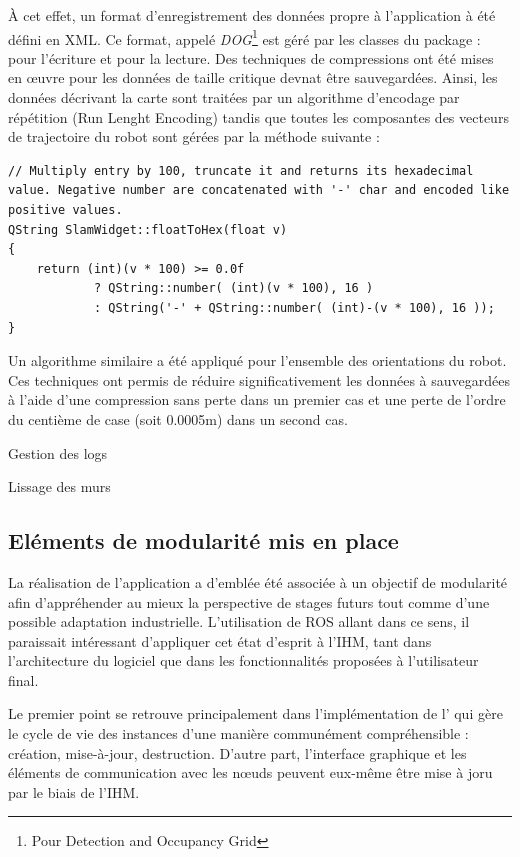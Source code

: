 \`{A} cet effet, un format d'enregistrement des données propre à l'application à été défini en \gls{XML}.
Ce format, appelé \emph{DOG}\footnote{Pour Detection and Occupancy Grid} est géré par les classes du package  :  pour l'écriture et  pour la lecture. 
Des techniques de compressions ont été mises en \oe{}uvre pour les données de taille critique devnat être sauvegardées. 
Ainsi, les données décrivant la carte sont traitées par un algorithme d'encodage par répétition (Run Lenght Encoding) tandis que toutes les composantes des vecteurs de trajectoire du robot sont gérées par la méthode suivante :

\begin{lstlisting}[style=customcpp]
// Multiply entry by 100, truncate it and returns its hexadecimal value. Negative number are concatenated with '-' char and encoded like positive values.
QString SlamWidget::floatToHex(float v)
{
    return (int)(v * 100) >= 0.0f
            ? QString::number( (int)(v * 100), 16 )
            : QString('-' + QString::number( (int)-(v * 100), 16 ));
}
\end{lstlisting}

Un algorithme similaire a été appliqué pour l'ensemble des orientations du robot. 
Ces techniques ont permis de réduire significativement les données à sauvegardées à l'aide d'une compression sans perte dans un  premier cas et une perte de l'ordre du centième de case (soit 0.0005m) dans un second cas.  
  
  Gestion des logs
  
  Lissage des murs
  
  \subsection{Eléments de modularité mis en place}
  
  La réalisation de l'application a d'emblée été associée à un objectif de modularité afin d'appréhender au mieux la perspective de stages futurs tout comme d'une possible adaptation industrielle. 
  L'utilisation de ROS allant dans ce sens, il paraissait intéressant d'appliquer cet état d'esprit à l'\gls{IHM}, tant dans l'architecture du logiciel que dans les fonctionnalités proposées à l'utilisateur final. 
  
  Le premier point se retrouve principalement dans l'implémentation de l' qui gère le cycle de vie des instances d'une manière communément compréhensible : création, mise-à-jour, destruction.  
  D'autre part, l'interface graphique et les éléments de communication avec les n\oe{}uds peuvent eux-même être mise à joru par le biais de l'\gls{IHM}. 
